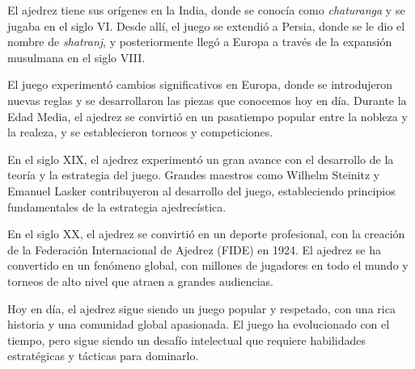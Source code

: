 El ajedrez tiene sus orígenes en la India, donde se conocía como \emph{chaturanga} y se jugaba en el siglo VI. Desde allí, el juego se extendió a Persia, donde se le dio el nombre de \emph{shatranj}, y posteriormente llegó a Europa a través de la expansión musulmana en el siglo VIII.

El juego experimentó cambios significativos en Europa, donde se introdujeron nuevas reglas y se desarrollaron las piezas que conocemos hoy en día. Durante la Edad Media, el ajedrez se convirtió en un pasatiempo popular entre la nobleza y la realeza, y se establecieron torneos y competiciones.

En el siglo XIX, el ajedrez experimentó un gran avance con el desarrollo de la teoría y la estrategia del juego. Grandes maestros como Wilhelm Steinitz y Emanuel Lasker contribuyeron al desarrollo del juego, estableciendo principios fundamentales de la estrategia ajedrecística.

En el siglo XX, el ajedrez se convirtió en un deporte profesional, con la creación de la Federación Internacional de Ajedrez (FIDE) en 1924. El ajedrez se ha convertido en un fenómeno global, con millones de jugadores en todo el mundo y torneos de alto nivel que atraen a grandes audiencias.

Hoy en día, el ajedrez sigue siendo un juego popular y respetado, con una rica historia y una comunidad global apasionada. El juego ha evolucionado con el tiempo, pero sigue siendo un desafío intelectual que requiere habilidades estratégicas y tácticas para dominarlo.